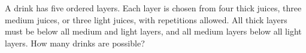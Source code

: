 A drink has five ordered layers. Each layer is chosen from four thick juices, three medium juices, or three light juices, with repetitions allowed. All thick layers must be below all medium and light layers, and all medium layers below all light layers. How many drinks are possible?

